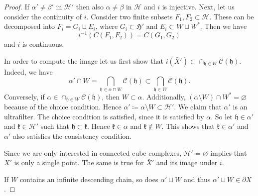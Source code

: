 \begin{proof}
  If \(\alpha' \neq \beta'\) in \(\mathcal{H}'\) then also \(\alpha \neq \beta\) in \(\mathcal{H}\) and \(i\) is injective. Next, let us consider the continuity of \(i\). Consider two finite subsets \(F_1, F_2 \subset \mathcal{H}\). These can be decomposed into \(F_i = G_i \sqcup E_i\), where \(G_i \subset \mathfrak{H}'\) and \(E_i \subset W \sqcup W^\ast\). Then we have
  \[
    i^{-1}(C(F_1, F_2)) = C(G_1, G_2)
  \]
  and \(i\) is continuous.

  In order to compute the image let us first show that \(i(\bar X') \subset \cap_{\mathfrak{h} \in W} \mathcal{C}(\mathfrak{h})\). Indeed, we have
  \[
    \alpha' \cap W = \bigcap_{\mathfrak{h} \in \alpha \sqcap W}\mathcal{C}(\mathfrak{h}) \subset \bigcap_{\mathfrak{h} \in W} \mathcal{C}(\mathfrak{h}).
  \]
  Conversely, if \(\alpha \in \cap_{\mathfrak{h} \in W}\mathcal{C}(\mathfrak{h})\), then \(W \subset \alpha\). Additionally, \((\alpha \setminus W) \cap W^\ast = \varnothing\) because of the choice condition. Hence \(\alpha' \coloneqq \alpha \setminus W \subset \mathcal{H}'\). We claim that \(\alpha'\) is an ultrafilter. The choice condition is satisfied, since it is satisfied by \(\alpha\). So let \(\mathfrak{h} \in \alpha'\) and \(\mathfrak{k} \in \mathcal{H}'\) such that \(\mathfrak{h} \subset \mathfrak{k}\). Hence \(\mathfrak{k} \in \alpha\) and \(\mathfrak{k} \notin W\). This shows that \(\mathfrak{k} \in \alpha'\) and \(\alpha'\) also satisfies the consistency condition.

  Since we are only interested in connected cube complexes, \(\mathcal{H}' = \varnothing\) implies that \(X'\) is only a single point. The same is true for \(\bar X'\) and its image under \(i\).

  If \(W\) contains an infinite descending chain, so does \(\alpha' \sqcup W\) and thus \(\alpha' \sqcup W \in \partial X\).
\end{proof}

